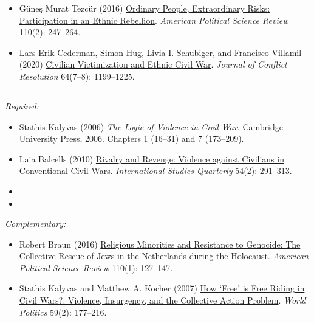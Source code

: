 \documentclass[12pt, a4paper]{article}
\begin{document}
\begin{itemize}
  \item Güne\c{s} Murat Tezcür (2016) \href{https://doi.org/10.1017/S0003055416000150}{Ordinary People, Extraordinary Risks: Participation in an Ethnic Rebellion}. \textit{American Political Science Review} 110(2): 247--264.
\end{itemize}


\begin{itemize}
  \item Lars-Erik Cederman, Simon Hug, Livia I. Schubiger, and Francisco Villamil (2020) \href{https://doi.org/10.1177/0022002719898873}{Civilian Victimization and Ethnic Civil War}. \textit{Journal of Conflict Resolution} 64(7–8): 1199--1225.
\end{itemize}


\vspace{20pt}
\hline
\subsection*{{\color{red}{Session 8: Wartime violence}}}

\noindent\textit{Required:}

\begin{itemize}
  \item Stathis Kalyvas (2006) \href{https://bibliotecas.uc3m.es/permalink/f/1nggclj/34UC3M_ALMA21161986050004213}{\textit{The Logic of Violence in Civil War}}. Cambridge University Press, 2006. Chapters 1 (16--31) and 7 (173--209).
  \item Laia Balcells (2010) \href{https://doi.org/10.1111/j.1468-2478.2010.00588.x}{Rivalry and Revenge: Violence against Civilians in Conventional Civil Wars}. \textit{International Studies Quarterly} 54(2): 291--313.
  \item {\color{red}{Weidmann, N. B. (2011). Violence “from above” or “from below”? The Role of Ethnicity in Bosnia’s Civil War. The Journal of Politics, 73(04), 1178-1190.}}
  \item {\color{red}{Cohen, D. K. (2013). Explaining rape during civil war: Cross-national evidence (1980– 2009). American Political Science Review, 107(03), 461-477.}}
\end{itemize}

\noindent\textit{Complementary:}

\begin{itemize}
  \item Robert Braun (2016) \href{https://doi.org/10.1017/S0003055415000544}{Religious Minorities and Resistance to Genocide: The Collective Rescue of Jews in the Netherlands during the Holocaust.} \textit{American Political Science Review} 110(1): 127--147.
  \item Stathis Kalyvas and Matthew A. Kocher (2007) \href{https://doi.org/10.1353/wp.2007.0023}{How `Free' is Free Riding in Civil Wars?: Violence, Insurgency, and the Collective Action Problem}. \textit{World Politics} 59(2): 177--216.
\end{itemize}
\end{document}
